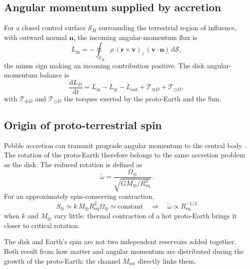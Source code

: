 \documentclass[11pt,a4paper,openany]{report}
\newcommand{\Mt}{M_{\oplus}}
\newcommand{\Req}{R_{\mathrm{eq}}}
\newcommand{\dd}{\mathrm{d}}
\begin{document}
\subsection{Angular momentum supplied by accretion}

For a closed control surface $\mathcal{S}_H$ surrounding the terrestrial region of influence, with
outward normal $\mathbf{n}$, the incoming angular-momentum flux is
\begin{equation}
\dot L_{\mathrm{in}}=-\oint_{\mathcal{S}_H}\rho\,(\mathbf{r}\times\mathbf{v})_z\,
(\mathbf{v}\cdot\mathbf{n})\,\dd\mathcal{S},
\label{eq:Lin}
\end{equation}
the minus sign making an incoming contribution positive. The disk angular-momentum balance is
\begin{equation}
\frac{\dd L_D}{\dd t}=\dot L_{\mathrm{in}}-\dot L_{\oplus}-\dot L_{\mathrm{out}}
+\mathcal{T}_{\oplus D}+\mathcal{T}_{\odot D},
\label{eq:bilanL}
\end{equation}
with $\mathcal{T}_{\oplus D}$ and $\mathcal{T}_{\odot D}$ the torques exerted by the proto-Earth and
the Sun.

\subsection{Origin of proto-terrestrial spin}

Pebble accretion can transmit prograde angular momentum to the central body
\cite{JohansenLacerda2010,Visser2020}. The rotation of the proto-Earth therefore belongs to the
same accretion problem as the disk. The reduced rotation is defined as
\begin{equation}
\tilde\omega=\frac{\Omega_\oplus}{\sqrt{G\Mt/\Req^3}}.
\label{eq:omegatilde}
\end{equation}
For an approximately spin-conserving contraction,
\begin{equation}
S_\oplus\simeq k\,\Mt\Req^2\Omega_\oplus\simeq\text{constant}
\quad\Longrightarrow\quad
\tilde\omega\propto\Req^{-1/2}
\label{eq:spin}
\end{equation}
when $k$ and $\Mt$ vary little: thermal contraction of a hot proto-Earth brings it closer to
critical rotation.

\begin{ideephys}
The disk and Earth's spin are not two independent reservoirs added together. Both result from how
matter and angular momentum are distributed during the growth of the proto-Earth; the channel
$\dot M_{\mathrm{rot}}$ directly links them.
\end{ideephys}
\end{document}
